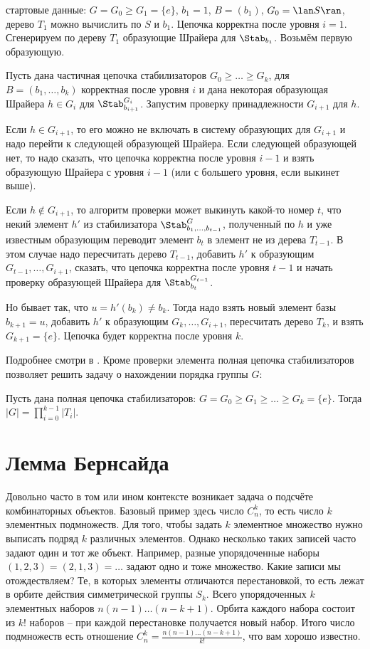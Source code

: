 \enm
\item стартовые данные: $G=G_0 \geq G_1=\{e\}$, $b_1=1$, $B=(b_1)$, $G_0=\lan S\ran$, дерево $T_1$ можно вычислить по $S$  и $b_1$. Цепочка корректна после уровня $i=1$. Сгенерируем по дереву $T_1$ образующие Шрайера для $\Stab_{b_1}$. Возьмём первую образующую.
\item Пусть дана частичная цепочка стабилизаторов $G_0\geq \dots\geq G_k$, для  $B=(b_1,\dots,b_k)$ корректная после уровня $i$ и дана некоторая образующая Шрайера $h\in G_i$ для $\Stab_{b_{i+1}}^{G_i}$. Запустим проверку принадлежности $G_{i+1}$ для $h$. 
\item Если $h\in G_{i+1}$, то его можно не включать в систему образующих для $G_{i+1}$ и надо перейти к следующей образующей Шрайера. Если следующей образующей нет, то надо сказать, что цепочка корректна после уровня $i-1$ и взять образующую Шрайера с уровня $i-1$ (или с большего уровня, если выкинет выше).
\item Если $h\notin G_{i+1}$, то алгоритм проверки может выкинуть какой-то номер $t$, что некий элемент $h'$ из стабилизатора $\Stab_{b_1,\dots,b_{t-1}}^G$, полученный по $h$ и уже известным образующим переводит элемент $b_t$ в элемент не из дерева $T_{t-1}$. В этом случае надо пересчитать дерево $T_{t-1}$, добавить $h'$ к образующим $G_{t-1},\dots,G_{i+1}$, сказать, что цепочка корректна после уровня $t-1$ и начать проверку образующей Шрайера для $\Stab_{b_t}^{G_{t-1}}$. 
\item Но бывает так, что $u=h'(b_k)\neq b_k$. Тогда надо взять новый элемент базы $b_{k+1}=u$, добавить $h'$ к образующим $G_k,\dots,G_{i+1}$, пересчитать дерево $T_k$, и взять $G_{k+1}=\{e\}$. Цепочка будет корректна после уровня $k$.
\eenm


Подробнее смотри в \cite{PGA}. Кроме проверки элемента полная цепочка стабилизаторов позволяет решить задачу о нахождении порядка группы $G$:


 Пусть дана полная цепочка стабилизаторов: $G=G_0\geq G_1\geq \dots \geq G_k=\{e\}$. Тогда $|G|=\prod_{i=0}^{k-1} |T_i|$. 
\ecrl




\section{Лемма Бернсайда}

Довольно часто в том или ином контексте возникает задача о подсчёте комбинаторных объектов. Базовый пример здесь число $C_{n}^k$, то есть число $k$ элементных подмножеств. Для того, чтобы задать $k$ элементное множество нужно выписать подряд $k$ различных элементов. Однако несколько таких записей часто задают один и тот же объект. Например, разные упорядоченные наборы $(1,2,3)=(2,1,3)=\dots$ задают одно и тоже множество. Какие записи мы отождествляем? Те, в которых элементы отличаются перестановкой, то есть лежат в орбите действия симметрической группы $S_k$. Всего упорядоченных $k$ элементных наборов $n(n-1)\dots(n-k+1)$. Орбита каждого набора состоит из $k!$ наборов -- при каждой перестановке получается новый набор. Итого число подмножеств есть отношение $C_n^k=\frac{n(n-1)\dots(n-k+1)}{k!}$, что вам хорошо известно. 



